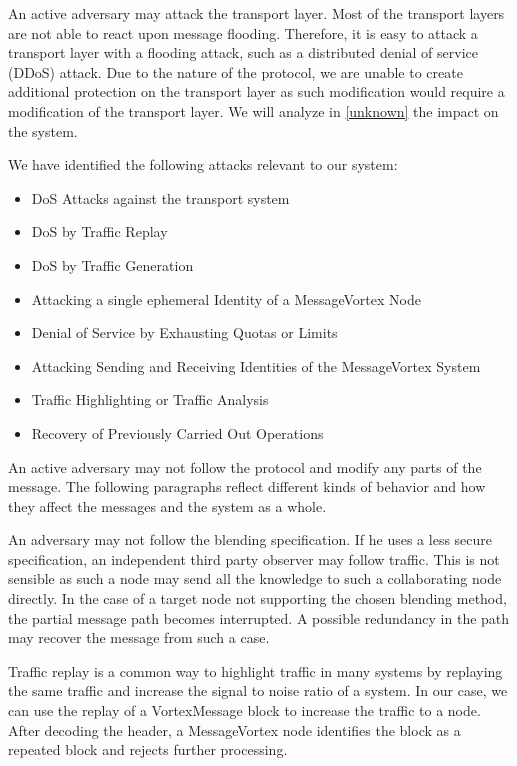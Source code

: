 An active adversary may attack the transport layer. Most of the transport layers are not able to react upon message flooding. Therefore, it is easy to attack a transport layer with a flooding attack, such as a distributed denial of service (DDoS) attack. Due to the nature of the protocol, we are unable to create additional protection on the transport layer as such modification would require a modification of the transport layer. We will analyze in \cref{unknown} the impact on the \MessageVortex{} system.

We have identified the following attacks relevant to our system:
\begin{itemize}
	\item DoS Attacks against the transport system
	\item DoS by Traffic Replay
	\item DoS by Traffic Generation
	\item Attacking a single ephemeral Identity of a MessageVortex Node
	\item Denial of Service by Exhausting Quotas or Limits
	\item Attacking Sending and Receiving Identities of the MessageVortex System
	\item Traffic Highlighting or Traffic Analysis
	\item Recovery of Previously Carried Out Operations
\end{itemize}

An active adversary may not follow the protocol and modify any parts of the message. The following paragraphs reflect different kinds of behavior and how they affect the messages and the system as a whole.

An adversary may not follow the blending specification. If he uses a less secure specification, an independent third party observer may follow traffic. This is not sensible as such a node may send all the knowledge to such a collaborating node directly. In the case of a  target node not supporting the chosen blending method, the partial message path becomes interrupted. A possible redundancy in the path may recover the message from such a case.

Traffic replay is a common way to highlight traffic in many systems by replaying the same traffic and increase the signal to noise ratio of a system. In our case, we can use the replay of a VortexMessage block to increase the traffic to a node. After decoding the header, a MessageVortex node identifies the block as a repeated block and rejects further processing. 

